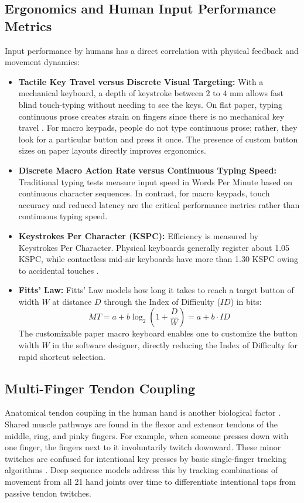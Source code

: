 \subsection{Ergonomics and Human Input Performance Metrics}
\label{subsec:lit_fitts_law}
Input performance by humans has a direct correlation with physical feedback and movement dynamics:
\begin{itemize}
    \item \textbf{Tactile Key Travel versus Discrete Visual Targeting:} With a mechanical keyboard, a depth of keystroke between $2\text{ to }4\text{ mm}$ allows fast blind touch-typing without needing to see the keys. On flat paper, typing continuous prose creates strain on fingers since there is no mechanical key travel \cite{ReviewVirtualKeyboard2020}. For macro keypads, people do not type continuous prose; rather, they look for a particular button and press it once. The presence of custom button sizes on paper layouts directly improves ergonomics.
    \item \textbf{Discrete Macro Action Rate versus Continuous Typing Speed:} Traditional typing tests measure input speed in Words Per Minute based on continuous character sequences. In contrast, for macro keypads, touch accuracy and reduced latency are the critical performance metrics rather than continuous typing speed.
    \item \textbf{Keystrokes Per Character (KSPC):} Efficiency is measured by Keystrokes Per Character. Physical keyboards generally register about 1.05 KSPC, while contactless mid-air keyboards have more than 1.30 KSPC owing to accidental touches \cite{Boletsis2019TextInput}.
    \item \textbf{Fitts' Law:} Fitts' Law models how long it takes to reach a target button of width $W$ at distance $D$ through the Index of Difficulty ($ID$) in bits:
    \begin{equation}
    MT = a + b \log_2 \left( 1 + \frac{D}{W} \right) = a + b \cdot ID
    \label{eq:fitts_law}
    \end{equation}
    The customizable paper macro keyboard enables one to customize the button width $W$ in the software designer, directly reducing the Index of Difficulty for rapid shortcut selection.
\end{itemize}

\subsection{Multi-Finger Tendon Coupling}
\label{subsec:lit_biomechanical_coupling}
Anatomical tendon coupling in the human hand is another biological factor \cite{Simao2016Unsupervised, Pilkov2024Markerless}. Shared muscle pathways are found in the flexor and extensor tendons of the middle, ring, and pinky fingers. For example, when someone presses down with one finger, the fingers next to it involuntarily twitch downward. These minor twitches are confused for intentional key presses by basic single-finger tracking algorithms \cite{Thomas2013Camera, Srivastava2012RealTime}. Deep sequence models address this by tracking combinations of movement from all 21 hand joints over time to differentiate intentional taps from passive tendon twitches.

